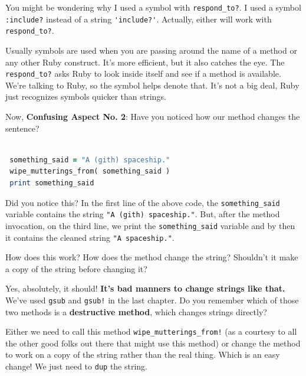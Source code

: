 \documentclass[10pt,twoside]{report}
\begin{document}
You might be wondering why I used a symbol with
\lstinline[breaklines=true]|respond_to?|.  I used a symbol
\lstinline[breaklines=true]|:include?| instead of a string
\lstinline[breaklines=true]|'include?'|.  Actually, either will work
with \lstinline[breaklines=true]|respond_to?|.

Usually symbols are used when you are passing around the name of a
method or any other Ruby construct. It's more efficient, but it also
catches the eye.  The \lstinline[breaklines=true]|respond_to?| asks
Ruby to look inside itself and see if a method is available.  We're
talking to Ruby, so the symbol helps denote that.  It's not a big
deal, Ruby just recognizes symbols quicker than strings.

Now, {\bf Confusing Aspect No. 2}: Have you noticed how our method
changes the sentence?


\begin{lstlisting}[basicstyle=\ttfamily\color{basiccolor},
    commentstyle = \ttfamily\color{commentcolor},
    keywordstyle=\ttfamily\color{keywordscolor},
    stringstyle=\color{stringcolor},
    language=Ruby,
    basicstyle=\small\ttfamily,
    showstringspaces=false,
  ]

 something_said = "A (gith) spaceship."
 wipe_mutterings_from( something_said )
 print something_said

\end{lstlisting}


Did you notice this?  In the first line of the above code, the
\lstinline[breaklines=true]|something_said| variable contains the
string \lstinline[breaklines=true]|"A (gith) spaceship."|.  But, after
the method invocation, on the third line, we print the
\lstinline[breaklines=true]|something_said| variable and by then it
contains the cleaned string \lstinline[breaklines=true]|"A spaceship."|.

How does this work?  How does the method change the string?  Shouldn't
it make a copy of the string before changing it?

Yes, absolutely, it should!  {\bf It's bad manners to change strings
  like that.}  We've used \lstinline[breaklines=true]|gsub| and
\lstinline[breaklines=true]|gsub!| in the last chapter.  Do you
remember which of those two methods is a {\bf destructive method},
which changes strings directly?

Either we need to call this method
\lstinline[breaklines=true]|wipe_mutterings_from!| (as a courtesy to
all the other good folks out there that might use this method) or
change the method to work on a copy of the string rather than the real
thing.  Which is an easy change!  We just need to
\lstinline[breaklines=true]|dup| the string.
\end{document}
